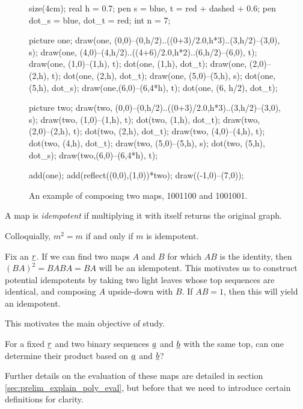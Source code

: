 \begin{figure}[ht]
	\centering
	\begin{asy}
	size(4cm);
	real h = 0.7;
	pen s = blue, t = red + dashed + 0.6;
	pen dot_s = blue, dot_t = red;
	int n = 7;

	picture one;
	draw(one, (0,0)--(0,h/2)..((0+3)/2.0,h*3)..(3,h/2)--(3,0), s);
	draw(one, (4,0)--(4,h/2)..((4+6)/2.0,h*2)..(6,h/2)--(6,0), t);
	draw(one, (1,0)--(1,h), t);
	dot(one, (1,h), dot_t);
	draw(one, (2,0)--(2,h), t);
	dot(one, (2,h), dot_t);
	draw(one, (5,0)--(5,h), s);
	dot(one, (5,h), dot_s);
	draw(one,(6,0)--(6,4*h), t);
	dot(one, (6, h/2), dot_t);

	picture two;
	draw(two, (0,0)--(0,h/2)..((0+3)/2.0,h*3)..(3,h/2)--(3,0), s);
	draw(two, (1,0)--(1,h), t);
	dot(two, (1,h), dot_t);
	draw(two, (2,0)--(2,h), t);
	dot(two, (2,h), dot_t);
	draw(two, (4,0)--(4,h), t);
	dot(two, (4,h), dot_t);
	draw(two, (5,0)--(5,h), s);
	dot(two, (5,h), dot_s);
	draw(two,(6,0)--(6,4*h), t);

	add(one); add(reflect((0,0),(1,0))*two);
	draw((-1,0)--(7,0));
	\end{asy}
	\caption{An example of composing two maps, 1001100 and 1001001.}
	\label{fig:example_compose}
\end{figure}

\begin{definition*}
	A map is \emph{idempotent} if multiplying it with itself returns the original graph.
\end{definition*}
Colloquially, $m^2=m$ if and only if $m$ is idempotent.

Fix an $\underline{r}$.  If we can find two maps $A$ and $B$ for which $AB$ is the identity, then $(BA)^2=BABA=BA$ will be an idempotent.  This motivates us to construct potential idempotents by taking two light leaves whose top sequences are identical, and composing $A$ upside-down with $B$.  If $AB=1$, then this will yield an idempotent.

This motivates the main objective of study.
\begin{ques*}
	For a fixed $\underline{r}$ and two binary sequences $\underline{a}$ and $\underline{b}$ with the same top, can one determine their product based on $\underline{a}$ and $\underline{b}$?
\end{ques*}

Further details on the evaluation of these maps are detailed in section \ref{sec:prelim_explain_poly_eval}, but before that we need to introduce certain definitions for clarity.



